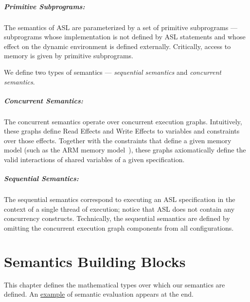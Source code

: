\documentclass{book}
\begin{document}
\paragraph{Primitive Subprograms:}
The semantics of ASL are parameterized by a set of primitive subprograms ---
subprograms whose implementation is not defined by ASL statements and whose effect on the dynamic environment
is defined externally. Critically, access to memory is given by primitive subprograms.

We define two types of semantics --- \emph{sequential semantics} and \emph{concurrent semantics}.

\paragraph{Concurrent Semantics:}
The concurrent semantics operate over concurrent execution graphs.
Intuitively, these graphs define Read Effects and Write Effects to variables and constraints over those effects.
Together with the constraints that define a given memory model (such as the ARM memory model~\cite{AlglaveDGHM21}),
these graphs axiomatically define
the valid interactions of shared variables of a given specification.

\paragraph{Sequential Semantics:}
The sequential semantics correspond to executing an ASL specification in the context of a single thread
of execution; notice that ASL does not contain any concurrency constructs.
%
Technically, the sequential semantics are defined by omitting the concurrent execution graph components
from all configurations.



\chapter{Semantics Building Blocks}
\label{chap:semanticsbuildingblocks}
This chapter defines the mathematical types over which our semantics are defined.
An \hyperlink{eval-example}{example} of semantic evaluation appears at the end.

\end{document}
